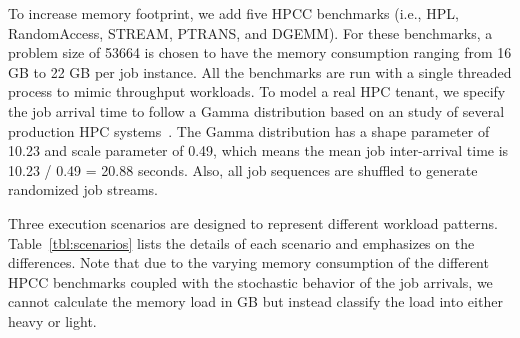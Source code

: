 
To increase memory footprint, we add five HPCC benchmarks (i.e., HPL, RandomAccess, STREAM, PTRANS, and DGEMM). For these  benchmarks, a problem size of 53664 is chosen to have the memory consumption ranging from 16 GB to 22 GB per job instance. All the benchmarks are run with a single threaded process to mimic throughput workloads. 
To model a real HPC tenant, we specify the job arrival time to follow a Gamma distribution based on an study of several production HPC systems~\cite{lublin2003workload}.  
The Gamma distribution has a shape parameter of 10.23 and scale parameter of 0.49, which means the mean job inter-arrival time is 10.23 / 0.49 = 20.88 seconds. 
Also, all job sequences are shuffled to generate randomized job streams. %

Three execution scenarios are designed to represent different workload patterns. 
Table~\ref{tbl:scenarios} lists the details of each scenario and emphasizes on the differences.
Note that due to the varying memory consumption of the different HPCC benchmarks coupled with the stochastic behavior of the job arrivals, we cannot calculate the memory load in GB but instead classify the load into either heavy or light.  

